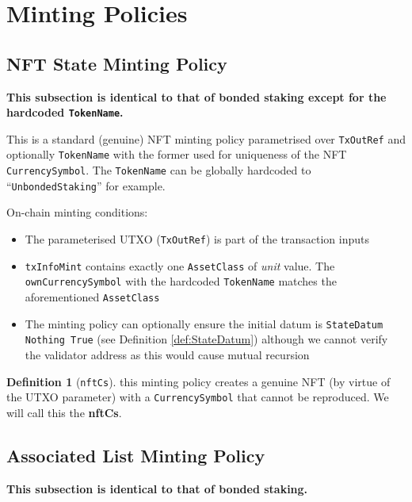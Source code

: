 \documentclass[10pt, a4paper]{article}
\theoremstyle{definition}
\newtheorem{definition}{Definition}[section]
\begin{document}
\section{Minting Policies}\label{section:MintingPolicies}
\subsection{NFT State Minting Policy}\label{subsection:NFTStateMintingPolicy}
\textbf{This subsection is identical to that of bonded staking except for the hardcoded \texttt{TokenName}.}

This is a standard (genuine) NFT minting policy parametrised over \texttt{TxOutRef} and optionally \texttt{TokenName} with the former used for uniqueness of the NFT \texttt{CurrencySymbol}. The \texttt{TokenName} can be globally hardcoded to ``\texttt{UnbondedStaking}'' for example.

On-chain minting conditions:
\begin{itemize}
\item{The parameterised UTXO (\texttt{TxOutRef}) is part of the transaction inputs}
\item{\texttt{txInfoMint} contains exactly one \texttt{AssetClass} of \textit{unit} value. The \texttt{ownCurrencySymbol} with the hardcoded \texttt{TokenName} matches the aforementioned \texttt{AssetClass}}
\item{The minting policy can optionally ensure the initial datum is \texttt{StateDatum Nothing True} (see Definition \ref{def:StateDatum}) although we cannot verify the validator address as this would cause mutual recursion}
\end{itemize}
\begin{definition}[\texttt{nftCs}]\label{def:nftCs} this minting policy creates a genuine NFT (by virtue of the UTXO parameter) with a \texttt{CurrencySymbol} that cannot be reproduced. We will call this the \textbf{nftCs}.
\end{definition}

\subsection{Associated List Minting Policy}\label{subsection:AssociatedListMintingPolicy}
\textbf{This subsection is identical to that of bonded staking.}
\end{document}
